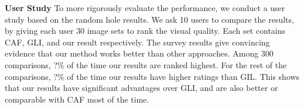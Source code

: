 \begin{table}[h!]
\begin{center}
  \end{center}
  \caption{Numerical comparison between CAF, CE and GIL, our generator head results and our final results. Up/down are results of center/random region completion. Note that for SSIM, larger values mean greater similarity in terms of content structure and are indicators of better performance.}
  \vspace{-10pt}
  \label{table:numerical}
\end{table}

\noindent\textbf{User Study}
To more rigorously evaluate the performance, we conduct a user study based on the random hole results. We ask 10 users to compare the results, by giving each user 30 image sets to rank the visual quality. Each set contains CAF, GLI, and our result respectively. The survey results give convincing evidence that our method works better than other approaches. Among 300 comparisons, ?\% of the time our results are ranked highest. For the rest of the comparisons, ?\% of the time our results have higher ratings than GIL. This shows that our results have significant advantages over GLI, and are also better or comparable with CAF most of the time.

